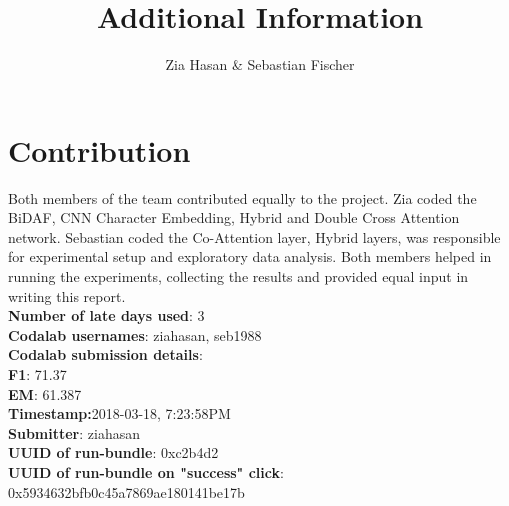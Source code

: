 \documentclass{article}
\begin{document}
\title{Additional Information}
\author{Zia Hasan \& Sebastian Fischer}
\maketitle

\section*{Contribution}
Both members of the team contributed equally to the project.  Zia coded the BiDAF, CNN Character Embedding, Hybrid and Double Cross Attention network. Sebastian coded the Co-Attention layer, Hybrid layers, was responsible for experimental setup and exploratory data analysis. Both members helped in  running the experiments, collecting the results and provided equal input in writing this report.
\\
\textbf{Number of late days used}: 3\\
\textbf{Codalab usernames}: ziahasan, seb1988\\
\textbf{Codalab submission details}:\\
\textbf{F1}: 71.37\\
\textbf{EM}: 61.387\\
\textbf{Timestamp:}2018-03-18, 7:23:58PM\\
\textbf{Submitter}: ziahasan\\
\textbf{UUID of run-bundle}: 0xc2b4d2\\
\textbf{UUID of run-bundle on "success" click}: 0x5934632bfb0c45a7869ae180141be17b
\end{document}
